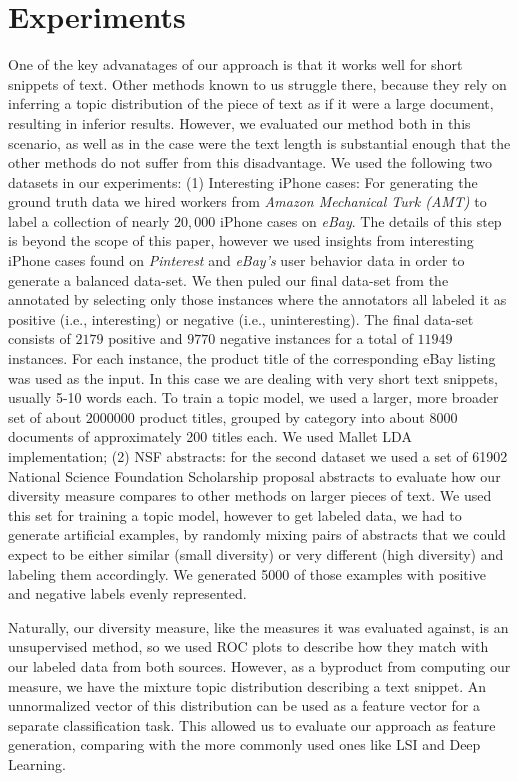 \documentclass{article} %
\begin{document}
\section{Experiments}
\label{sec:experiments}
One of the key advanatages of our approach is that it works well for
short snippets of text. Other methods known to us struggle there,
because they rely on inferring a topic distribution of the piece of
text as if it were a large document, resulting in inferior
results. However, we evaluated our method both in this scenario, as
well as in the case were the text length is substantial enough that
the other methods do not suffer from this disadvantage.
We used the following two datasets in our experiments: (1) Interesting iPhone cases:
For generating the ground truth data we hired workers from {\em Amazon Mechanical Turk (AMT)} to label a collection
of nearly $20,000$ iPhone cases on {\em eBay}. The details of this step is beyond the scope of this paper, however we used insights from
interesting iPhone cases found on {\em Pinterest} and {\em eBay's} user behavior data in order to generate a balanced data-set. 
We then puled our final data-set from the annotated by selecting only those instances where the annotators all labeled it as
positive (i.e., interesting) or negative (i.e., uninteresting). The final data-set consists of $2179$ positive and $9770$ negative instances for
a total of $11949$ instances. For each instance, the product title of
the corresponding eBay listing was used as the input. In this case we are
dealing with very short text snippets, usually 5-10 words each. To
train a topic model, we used a larger, more broader set of about
$2000000$ product titles, grouped by category into  about $8000$
documents of approximately 200 titles each. We used Mallet LDA implementation; (2) NSF
abstracts: for the second dataset we used a set of 61902 National Science Foundation
Scholarship proposal abstracts to evaluate how our diversity measure
compares to other methods on larger pieces of text. We used this set
for training a topic model, however to get labeled data, we had to
generate artificial examples, by randomly mixing pairs of abstracts that we
could expect to be either similar (small diversity) or very different
(high diversity) and labeling them accordingly. We generated 5000 of
those examples with positive and negative labels evenly represented.

Naturally, our diversity measure, like the measures it was evaluated
against, is an unsupervised method, so we used ROC plots to describe
how they match with our labeled data from both sources. However,
as a byproduct from computing our measure, we have the mixture topic
distribution describing a text snippet. An unnormalized vector of this
distribution can be used as a feature vector for a separate
classification task. This allowed us to evaluate our approach as
feature generation, comparing with the more commonly used ones like
LSI and Deep Learning.
\end{document}
